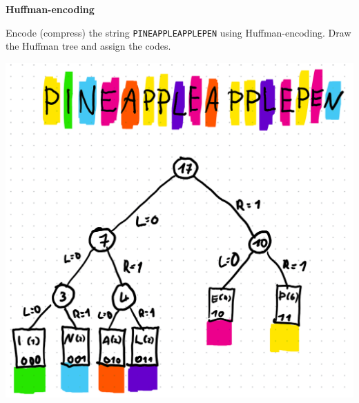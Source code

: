 \question \textbf{Huffman-encoding}

Encode (compress) the string \texttt{PINEAPPLEAPPLEPEN} using Huffman-encoding. Draw the Huffman tree and assign the codes.


\begin{solution}

    
    \includegraphics[width=0.8\linewidth]{task_1/solution_a1.png}
\end{solution}
